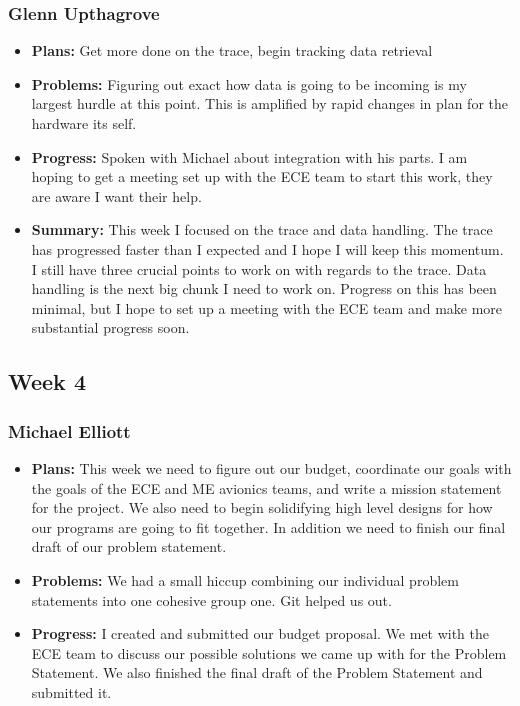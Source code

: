 \documentclass[onecolumn, draftclsnofoot,10pt, compsoc]{IEEEtran}
\begin{document}
\subsubsection{Glenn Upthagrove}
\begin {itemize}
 \item \textbf{Plans: }Get more done on the trace, begin tracking data retrieval 
 \item \textbf{Problems: }Figuring out exact how data is going to be incoming is my largest hurdle at this point. This is amplified by rapid changes in plan for the hardware its self. 
 \item \textbf{Progress: }Spoken with Michael about integration with his parts. I am hoping to get a meeting set up with the ECE team to start this work, they are aware I want their help.  
 \item \textbf{Summary: }This week I focused on the trace and data handling. The trace has progressed faster than I expected and I hope I will keep this momentum. I still have three crucial points to work on with regards to the trace. Data handling is the next big chunk I need to work on. Progress on this has been minimal, but I hope to set up a meeting with the ECE team and make more substantial progress soon. 
\end {itemize}
\subsection {Week 4}
\subsubsection{Michael Elliott}
\begin {itemize}
\item \textbf{Plans: }
  This week we need to figure out our budget, coordinate our goals with the goals of the ECE and ME avionics teams, and write a mission statement for the project. We also need to begin solidifying high level designs for how our programs are going to fit together. In addition we need to finish our final draft of our problem statement.
\item \textbf{Problems: }
  We had a small hiccup combining our individual problem statements into one cohesive group one. Git helped us out.
\item \textbf{Progress: }
  I created and submitted our budget proposal. We met with the ECE team to discuss our possible solutions we came up with for the Problem Statement. We also finished the final draft of the Problem Statement and submitted it.
\end {itemize}
\end{document}
